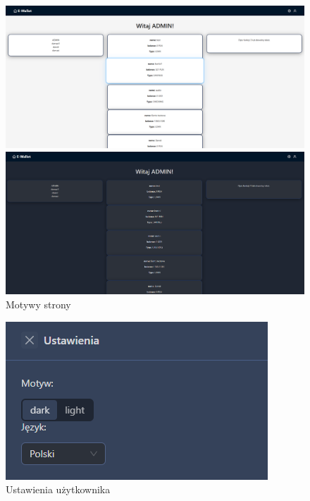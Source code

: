 \begin{figure}[H]
    \begin{minipage}{0.5\textwidth}
	\centering
	\includegraphics[width=\linewidth]{images/MotywJasny}
\end{minipage}
\hfill
\begin{minipage}{0.5\textwidth}
	\centering
	\includegraphics[width=\linewidth]{images/MotywCiemny}
\end{minipage}
	\caption{Motywy strony}
	\label{fig:motywy}
\end{figure}

\begin{figure}[H]
	\centering
	\includegraphics[width=0.7\linewidth]{images/Ustawienia}
	\caption{Ustawienia użytkownika}
	\label{fig:ustawienia}
\end{figure}
